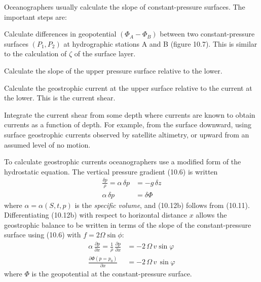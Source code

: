 Oceanographers usually calculate the slope of constant-pressure
surfaces.  The important steps are:
\begin{enumerate}
\vitem Calculate differences in geopotential $\left( \Phi_A - \Phi_B \right)$
between two constant-pressure surfaces $\left( P_1 , P_2 \right)$
at hydrographic stations A and B
(figure 10.7). This is similar to the calculation of $\zeta$ of the
surface layer.

\vitem Calculate the slope of the upper pressure surface relative to
the lower.

\vitem Calculate the geostrophic current at the upper surface relative
to the current at the lower. This is the current shear.

\vitem Integrate the current shear from some depth where currents are
known to obtain currents as a function of depth. For example, from the
surface downward, using surface geostrophic currents observed by
satellite altimetry, or upward from an assumed level of no motion.
\end{enumerate}
To calculate geostrophic currents oceanographers use a modified form
of the hydrostatic equation. The vertical pressure gradient (10.6) is
written
\begin{subequations}
\begin{align}
\frac{\delta p}{\rho}=\alpha\,\delta p &=-g\,\delta z \\
\alpha\,\delta p&=\delta\Phi
\end{align}
\end{subequations}
where $\alpha = \alpha(S,t,p)$ is the \textit{specific
  volume}, and (10.12b) follows from
(10.11). Differentiating (10.12b) with respect to horizontal distance
$x$ allows the geo\-stro\-phic balance to be written in terms of the
slope of the constant-pressure surface using (10.6) with $f = 2 \Omega
\sin \phi $:
\begin{subequations}
\begin{align}
\alpha\,\frac{\partial p}{\partial x} =\frac{1}{\rho}\,\frac{\partial
p}{\partial x} &=-2\,\Omega \,v\sin \varphi \\
\frac{\partial \Phi \left( p=p_0 \right)} {\partial x}
 &= - 2 \, \Omega \,v \, \sin{\varphi}
\end{align}
\end{subequations}
where $\Phi$ is the geopotential at the constant-pressure surface.

